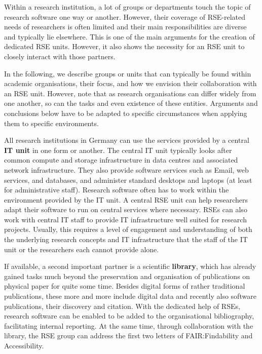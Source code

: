 \documentclass[a4paper]{article}
\begin{document}
Within a research institution, a lot of groups or departments touch the topic of research software one way or another.
However, their coverage of RSE-related needs of researchers is often limited and their main responsibilities are diverse and typically lie elsewhere.
This is one of the main arguments for the creation of dedicated RSE units.
However, it also shows the necessity for an RSE unit to closely interact with those partners.

In the following, we describe groups or units that can typically be found within academic organisations, their focus, and how we envision their collaboration with an RSE unit.
However, note that as research organisations can differ widely from one another, so can the tasks and even existence of these entities.
Arguments and conclusions below have to be adapted to specific circumstances when applying them to specific environments.

All research institutions in Germany can use the services provided by a central \textbf{IT unit} in one form or another.
The central IT unit typically looks after common compute and storage infrastructure in data centres and associated network infrastructure.
They also provide software services such as Email, web services, and databases, and administer standard desktops and laptops (at least for administrative staff).
Research software often has to work within the environment provided by the IT unit.
A central RSE unit can help researchers adapt their software to run on central services where necessary.
RSEs can also work with central IT staff to provide IT infrastructure well suited for research projects.
Usually, this requires a level of engagement and understanding of both the underlying research concepts and IT infrastructure that the staff of the IT unit or the researchers each cannot provide alone.

If available, a second important partner is a scientific \textbf{library}, which has already gained tasks much beyond the preservation and organisation of publications on physical paper for quite some time.
Besides digital forms of rather traditional publications, these more and more include digital data and recently also software publications, their discovery and citation.
With the dedicated help of RSEs, research software can be enabled to be added to the organisational bibliography, facilitating internal reporting.
At the same time, through collaboration with the library, the RSE group can address the first two letters of FAIR:\@ Findability and Accessibility.
\end{document}
